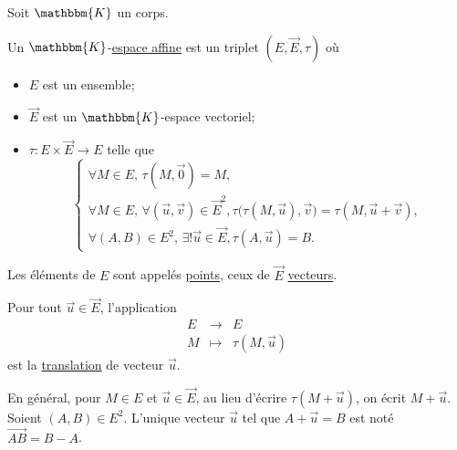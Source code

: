 Soit $\mathbbm{K}$ un corps.
\begin{defn}
	Un $\mathbbm{K}$-\underline{espace affine} est un triplet $\left( E, \vec{E}, \tau \right)$ où
	\begin{itemize}
		\item $E$ est un ensemble;\\
		\item $\vec{E}$ est un $\mathbbm{K}$-espace vectoriel;\\
		\item $\tau : E \times \vec{E} \longrightarrow E$ telle que \[
				\begin{cases}
					\forall M \in E,\, \tau\left( M, \vec{0} \right) = M,\\[2mm]
					\forall M \in E,\,\forall \left( \vec{u}, \vec{v} \right) \in {\vec{E}}^2,
					\tau\Big(\tau\left( M, \vec{u} \right), \vec{v} \Big) = \tau\left( M, \vec{u} + \vec{v} \right),\\[2mm]
					\forall (A, B) \in E^2,\, \exists! \vec{u} \in \vec{E}, \tau\left( A, \vec{u} \right) = B.
				\end{cases}
			\]
	\end{itemize}

	Les éléments de $E$ sont appelés \underline{points}, ceux de $\vec{E}$ \underline{vecteurs}.

	Pour tout $\vec{u} \in \vec{E}$, l'application \[
		\begin{array}{rcl}
			E &\longrightarrow& E \\
			M &\longmapsto& \tau\left( M, \vec{u} \right)
		\end{array}
	\] est la \underline{translation}  de vecteur $\vec{u}$.

	En général, pour $M \in E$ et $\vec{u} \in \vec{E}$, au lieu d'écrire $\tau\left( M + \vec{u} \right)$, on écrit $M + \vec{u}$. Soient $(A,B) \in E^2$. L'unique vecteur $\vec{u}$ tel que $A + \vec{u} = B$ est noté $\vec{AB} = B - A$.
\end{defn}

